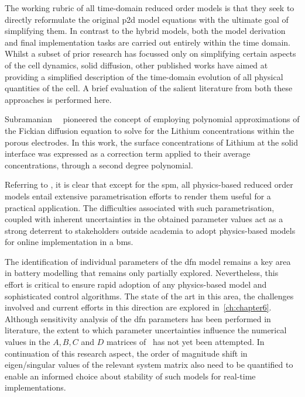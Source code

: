 The working rubric of all time-domain reduced  order models is that they seek to
directly reformulate  the original \gls{p2d}  model equations with  the ultimate
goal  of simplifying  them. In  contrast to  the hybrid  models, both  the model
derivation and  final implementation tasks  are carried out entirely  within the
time domain. Whilst a subset of  prior research has focussed only on simplifying
certain aspects  of the  cell dynamics, \eg{}  solid diffusion,  other published
works  have aimed  at  providing  a simplified  description  of the  time-domain
evolution of  all physical  quantities of  the cell. A  brief evaluation  of the
salient literature from both these approaches is performed here.

Subramanian~\etal~\cite{Subramanian2004}  pioneered  the  concept  of  employing
polynomial  approximations  of  the  Fickian diffusion  equation  to  solve  for
the  Lithium concentrations  within the  porous  electrodes. In  this work,  the
surface concentrations  of Lithium  at the  solid interface  was expressed  as a
correction term applied to their average concentrations, through a second degree
polynomial.


Referring  to  ,  it  is  clear that  except  for
the  \gls{spm},   all  physics-based  reduced  order   models  entail  extensive
parametrisation efforts   to render  them useful for a  practical application.
The  difficulties associated  with such  parametrisation, coupled  with inherent
uncertainties  in  the obtained  parameter  values  act  as a  strong  deterrent
to  stakeholders  outside academia  to  adopt  physics-based models  for  online
implementation in a \gls{bms}.




 The  identification of  individual parameters  of the  \gls{dfn}
model  remains a  key  area in  battery modelling  that  remains only  partially
explored. Nevertheless, this effort is critical  to ensure rapid adoption of any
physics-based model and  sophisticated control algorithms. The state  of the art
in this area, the challenges involved  and current efforts in this direction are
explored in~\cref{ch:chapter6}.  Although sensitivity analysis of  the \gls{dfn}
parameters has been performed in  literature,  the extent to
which  parameter uncertainties  influence the  numerical  values in  the $A,  B,
C$  and  $D$  matrices  of~ has  not  yet  been  attempted.
In  continuation of  this  research  aspect, the  order  of  magnitude shift  in
eigen/singular values of  the relevant system matrix also need  to be quantified
to  enable an  informed  choice about  stability of  such  models for  real-time
implementations.


